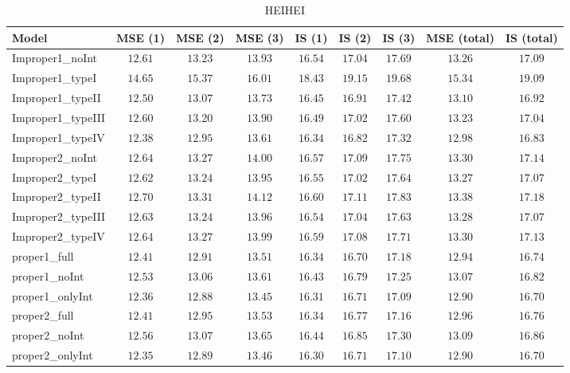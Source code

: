 \begin{table}

\caption{\label{tab:model-choice-sc4}HEIHEI}
\centering
\begin{tabular}{lcccccccc}
\hline
Model  & MSE (1) & MSE (2) & MSE (3) & IS (1) & IS (2) & IS (3) & MSE (total) & \multicolumn{1}{c}{IS (total)} \\ 
\hline
Improper1_noInt  & $12.61$ & $13.23$ & $13.93$ & $16.54$ & $17.04$ & $17.69$ & $13.26$ & $17.09$ \\
Improper1_typeI  & $14.65$ & $15.37$ & $16.01$ & $18.43$ & $19.15$ & $19.68$ & $15.34$ & $19.09$ \\
Improper1_typeII  & $12.50$ & $13.07$ & $13.73$ & $16.45$ & $16.91$ & $17.42$ & $13.10$ & $16.92$ \\
Improper1_typeIII  & $12.60$ & $13.20$ & $13.90$ & $16.49$ & $17.02$ & $17.60$ & $13.23$ & $17.04$ \\
Improper1_typeIV  & $12.38$ & $12.95$ & $13.61$ & $16.34$ & $16.82$ & $17.32$ & $12.98$ & $16.83$ \\
Improper2_noInt  & $12.64$ & $13.27$ & $14.00$ & $16.57$ & $17.09$ & $17.75$ & $13.30$ & $17.14$ \\
Improper2_typeI  & $12.62$ & $13.24$ & $13.95$ & $16.55$ & $17.02$ & $17.64$ & $13.27$ & $17.07$ \\
Improper2_typeII  & $12.70$ & $13.31$ & $14.12$ & $16.60$ & $17.11$ & $17.83$ & $13.38$ & $17.18$ \\
Improper2_typeIII  & $12.63$ & $13.24$ & $13.96$ & $16.54$ & $17.04$ & $17.63$ & $13.28$ & $17.07$ \\
Improper2_typeIV  & $12.64$ & $13.27$ & $13.99$ & $16.59$ & $17.08$ & $17.71$ & $13.30$ & $17.13$ \\
proper1_full  & $12.41$ & $12.91$ & $13.51$ & $16.34$ & $16.70$ & $17.18$ & $12.94$ & $16.74$ \\
proper1_noInt  & $12.53$ & $13.06$ & $13.61$ & $16.43$ & $16.79$ & $17.25$ & $13.07$ & $16.82$ \\
proper1_onlyInt  & $12.36$ & $12.88$ & $13.45$ & $16.31$ & $16.71$ & $17.09$ & $12.90$ & $16.70$ \\
proper2_full  & $12.41$ & $12.95$ & $13.53$ & $16.34$ & $16.77$ & $17.16$ & $12.96$ & $16.76$ \\
proper2_noInt  & $12.56$ & $13.07$ & $13.65$ & $16.44$ & $16.85$ & $17.30$ & $13.09$ & $16.86$ \\
proper2_onlyInt  & $12.35$ & $12.89$ & $13.46$ & $16.30$ & $16.71$ & $17.10$ & $12.90$ & $16.70$ \\
\hline 
\end{tabular}


\end{table}